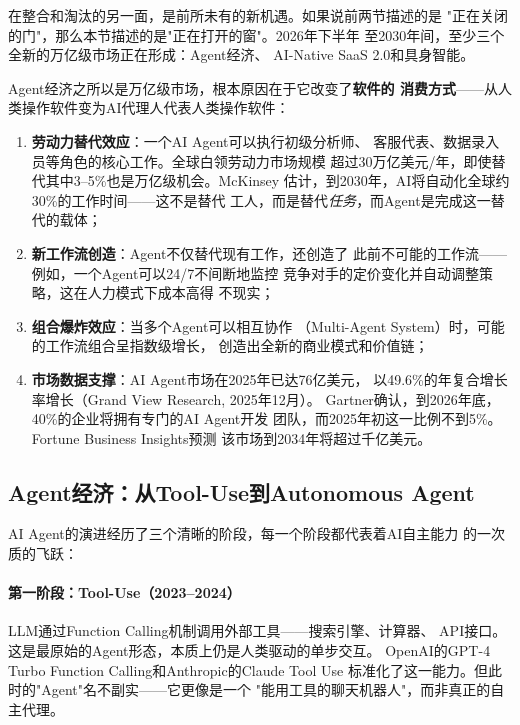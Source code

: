 在整合和淘汰的另一面，是前所未有的新机遇。如果说前两节描述的是
"正在关闭的门"，那么本节描述的是"正在打开的窗"。2026年下半年
至2030年间，至少三个全新的万亿级市场正在形成：Agent经济、
AI-Native SaaS 2.0和具身智能。

\begin{whybox}[为什么Agent经济是下一个万亿市场]
Agent经济之所以是万亿级市场，根本原因在于它改变了\textbf{软件的
消费方式}——从人类操作软件变为AI代理人代表人类操作软件：
\begin{enumerate}
  \item \textbf{劳动力替代效应}：一个AI Agent可以执行初级分析师、
    客服代表、数据录入员等角色的核心工作。全球白领劳动力市场规模
    超过30万亿美元/年，即使替代其中3--5\%也是万亿级机会。McKinsey
    估计，到2030年，AI将自动化全球约30\%的工作时间——这不是替代
    工人，而是替代\emph{任务}，而Agent是完成这一替代的载体；
  \item \textbf{新工作流创造}：Agent不仅替代现有工作，还创造了
    此前不可能的工作流——例如，一个Agent可以24/7不间断地监控
    竞争对手的定价变化并自动调整策略，这在人力模式下成本高得
    不现实；
  \item \textbf{组合爆炸效应}：当多个Agent可以相互协作
    （Multi-Agent System）时，可能的工作流组合呈指数级增长，
    创造出全新的商业模式和价值链；
  \item \textbf{市场数据支撑}：AI Agent市场在2025年已达76亿美元，
    以49.6\%的年复合增长率增长（Grand View Research, 2025年12月）。
    Gartner确认，到2026年底，40\%的企业将拥有专门的AI Agent开发
    团队，而2025年初这一比例不到5\%。Fortune Business Insights预测
    该市场到2034年将超过千亿美元。
\end{enumerate}
\end{whybox}


\subsection{Agent经济：从Tool-Use到Autonomous Agent}
\label{subsec:outlook-agent-economy}

AI Agent的演进经历了三个清晰的阶段，每一个阶段都代表着AI自主能力
的一次质的飞跃：

\paragraph{第一阶段：Tool-Use（2023--2024）}
LLM通过Function Calling机制调用外部工具——搜索引擎、计算器、
API接口。这是最原始的Agent形态，本质上仍是人类驱动的单步交互。
OpenAI的GPT-4 Turbo Function Calling和Anthropic的Claude Tool Use
标准化了这一能力。但此时的"Agent"名不副实——它更像是一个
"能用工具的聊天机器人"，而非真正的自主代理。

